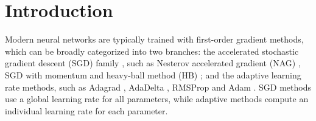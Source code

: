 \documentclass{article}
\begin{document}
\section{Introduction}

Modern neural networks are typically trained with first-order gradient methods, which
can be broadly categorized into two branches: the accelerated stochastic gradient descent (SGD) family \cite{robbins1951stochastic}, such as Nesterov accelerated gradient (NAG) \cite{nesterov27method}, SGD with momentum \cite{sutskever2013importance} and heavy-ball method (HB) \cite{polyak1964some}; and the adaptive learning rate methods, such as Adagrad \cite{duchi2011adaptive}, AdaDelta \cite{zeiler2012adadelta}, RMSProp \cite{graves2013generating} and Adam \cite{kingma2014adam}. SGD methods use a global learning rate for all parameters, while adaptive methods compute an individual learning rate for each parameter. 
\end{document}
